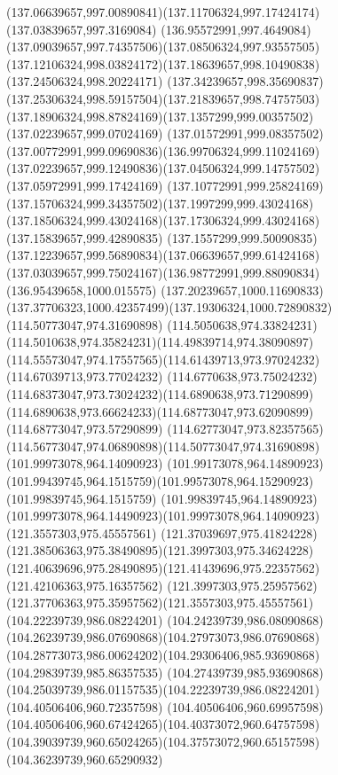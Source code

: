 {{	\curveto(137.06639657,997.00890841)(137.11706324,997.17424174)(137.03839657,997.3169084)
	\curveto(136.95572991,997.4649084)(137.09039657,997.74357506)(137.08506324,997.93557505)
	\curveto(137.12106324,998.03824172)(137.18639657,998.10490838)(137.24506324,998.20224171)
	\curveto(137.34239657,998.35690837)(137.25306324,998.59157504)(137.21839657,998.74757503)
	\curveto(137.18906324,998.87824169)(137.1357299,999.00357502)(137.02239657,999.07024169)
	\curveto(137.01572991,999.08357502)(137.00772991,999.09690836)(136.99706324,999.11024169)
	\curveto(137.02239657,999.12490836)(137.04506324,999.14757502)(137.05972991,999.17424169)
	\curveto(137.10772991,999.25824169)(137.15706324,999.34357502)(137.1997299,999.43024168)
	\curveto(137.18506324,999.43024168)(137.17306324,999.43024168)(137.15839657,999.42890835)
	\curveto(137.1557299,999.50090835)(137.12239657,999.56890834)(137.06639657,999.61424168)
	\curveto(137.03039657,999.75024167)(136.98772991,999.88090834)(136.95439658,1000.015575)
	\curveto(137.20239657,1000.11690833)(137.37706323,1000.42357499)(137.19306324,1000.72890832)
	\moveto(114.50773047,974.31690898)
	\curveto(114.5050638,974.33824231)(114.5010638,974.35824231)(114.49839714,974.38090897)
	\curveto(114.55573047,974.17557565)(114.61439713,973.97024232)(114.67039713,973.77024232)
	\curveto(114.6770638,973.75024232)(114.68373047,973.73024232)(114.6890638,973.71290899)
	\curveto(114.6890638,973.66624233)(114.68773047,973.62090899)(114.68773047,973.57290899)
	\curveto(114.62773047,973.82357565)(114.56773047,974.06890898)(114.50773047,974.31690898)
	\moveto(101.99973078,964.14090923)
	\lineto(101.99173078,964.14890923)
	\curveto(101.99439745,964.1515759)(101.99573078,964.15290923)(101.99839745,964.1515759)
	\curveto(101.99839745,964.14890923)(101.99973078,964.14490923)(101.99973078,964.14090923)
	\moveto(121.3557303,975.45557561)
	\curveto(121.37039697,975.41824228)(121.38506363,975.38490895)(121.3997303,975.34624228)
	\curveto(121.40639696,975.28490895)(121.41439696,975.22357562)(121.42106363,975.16357562)
	\curveto(121.3997303,975.25957562)(121.37706363,975.35957562)(121.3557303,975.45557561)
	\moveto(104.22239739,986.08224201)
	\curveto(104.24239739,986.08090868)(104.26239739,986.07690868)(104.27973073,986.07690868)
	\curveto(104.28773073,986.00624202)(104.29306406,985.93690868)(104.29839739,985.86357535)
	\curveto(104.27439739,985.93690868)(104.25039739,986.01157535)(104.22239739,986.08224201)
	\moveto(104.40506406,960.72357598)
	\curveto(104.40506406,960.69957598)(104.40506406,960.67424265)(104.40373072,960.64757598)
	\curveto(104.39039739,960.65024265)(104.37573072,960.65157598)(104.36239739,960.65290932)
}}
